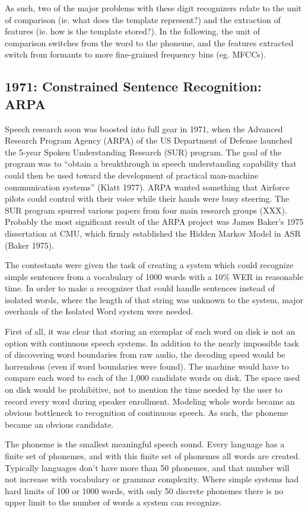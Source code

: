 \documentclass[10pt,a4paper]{article}
\begin{document}
As such, two of the major problems with these digit recognizers relate to the unit of comparison (ie. what does the template represent?) and the extraction of features (ie. how is the template stored?). In the following, the unit of comparison switches from the word to the phoneme, and the features extracted switch from formants to more fine-grained frequency bins (eg. MFCCs).

\subsection{1971: Constrained Sentence Recognition: ARPA}

 Speech research soon was boosted into full gear in 1971, when the Advanced Research Program Agency (ARPA) of the US Department of Defense launched the 5-year Spoken Understanding Research (SUR) program. The goal of the program was to ``obtain a breakthrough in speech understanding capability that could then be used toward the development of practical man-machine communication systems'' (Klatt 1977). ARPA wanted something that Airforce pilots could control with their voice while their hands were busy steering. The SUR program spurred various papers from four main research groups (XXX). Probably the most significant result of the ARPA project was James Baker's 1975 dissertation at CMU, which firmly established the Hidden Markov Model in ASR (Baker 1975).


 The contestants were given the task of creating a system which could recognize simple sentences from a vocabulary of 1000 words with a 10\% WER in reasonable time. In order to make a recognizer that could handle sentences instead of isolated words, where the length of that string was unknown to the system, major overhauls of the Isolated Word system were needed.

First of all, it was clear that storing an exemplar of each word on disk is not an option with continuous speech systems. In addition to the nearly impossible task of discovering word boundaries from raw audio, the decoding speed would be horrendous (even if word boundaries were found). The machine would have to compare each word to each of the 1,000 candidate words on disk. The space used on disk would be prohibitive, not to mention the time needed by the user to record every word during speaker enrollment. Modeling whole words became an obvious bottleneck to recognition of continuous speech. As such, the phoneme became an obvious candidate.

The phoneme is the smallest meaningful speech sound. Every language has a finite set of phonemes, and with this finite set of phonemes all words are created. Typically languages don't have more than 50 phonemes, and that number will not increase with vocabulary or grammar complexity. Where simple systems had hard limits of 100 or 1000 words, with only 50 discrete phonemes there is no upper limit to the number of words a system can recognize.
\end{document}
